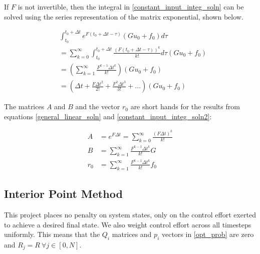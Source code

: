 \documentclass{exam}
\begin{document}
\begin{multicols*}{2}
If $F$ is not invertible, then the integral in \eqref{constant_input_integ_soln} can be solved using the series representation of the matrix exponential, shown below.

\begin{equation}
\begin{aligned}
    \label{constant_input_integ_soln2}
    &\int_{t_0}^{t_0 + \Delta t} e^{F(t_0 + \Delta t -\tau)} (G u_0 + f_0) d\tau \\
    &= \sum_{k=0}^\infty \int_{t_0}^{t_0 + \Delta t} \frac{(F(t_0 + \Delta t -\tau))^k}{k!} d \tau (G u_0 + f_0)\\
    &= \left( \sum_{k=1}^\infty \frac{F^{k-1} \Delta t^{k}}{k!} \right) (G u_0 + f_0) \\
    &= \left( \Delta t + \frac{F \Delta t^2}{2!} + \frac{F^2 \Delta t^3}{3!} + ... \right) (G u_0 + f_0)
\end{aligned}
\end{equation}

The matrices $A$ and $B$ and the vector $r_0$ are short hands for the results from equations \eqref{general_linear_soln} and \eqref{constant_input_integ_soln2}:

\begin{equation}
    \begin{aligned}
        A &= e^{F \Delta t} = \sum_{k=0}^\infty \frac{(F \Delta t)^{k}}{k!} \\
        B &= \sum_{k=1}^\infty \frac{F^{k-1} \Delta t^{k}}{k!} G \\
        r_0 &= \sum_{k=1}^\infty \frac{F^{k-1} \Delta t^{k}}{k!} f_0
    \end{aligned}
\end{equation}

\subsection{Interior Point Method}

This project places no penalty on system states, only on the control effort exerted to achieve a desired final state. We also weight control effort across all timesteps uniformly. This means that the $Q_i$ matrices and $p_i$ vectors in \eqref{opt_prob} are zero and $R_j = R ~\forall j \in [0, N]$.


\end{multicols*}
\end{document}
